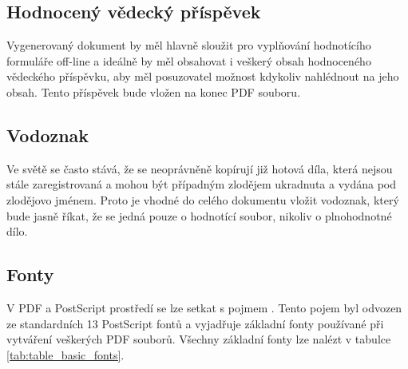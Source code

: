\subsection{Hodnocený vědecký příspěvek}
Vygenerovaný dokument by měl hlavně sloužit pro vyplňování hodnotícího formuláře off-line a ideálně by měl obsahovat i veškerý obsah hodnoceného vědeckého příspěvku, aby měl posuzovatel možnost kdykoliv nahlédnout na jeho obsah. Tento příspěvek bude vložen na konec PDF souboru.

\subsection{Vodoznak}
Ve světě se často stává, že se neoprávněně kopírují již hotová díla, která nejsou stále zaregistrovaná a mohou být případným zlodějem ukradnuta a vydána pod zlodějovo jménem. Proto je vhodné do celého dokumentu vložit vodoznak, který bude jasně říkat, že se jedná pouze o hodnotící soubor, nikoliv o plnohodnotné dílo.

\subsection{Fonty}
\label{subsec:fonty}
V PDF a PostScript prostředí se lze setkat s pojmem . Tento pojem byl odvozen ze standardních 13 PostScript fontů a vyjadřuje základní fonty používané při vytváření veškerých PDF souborů. Všechny základní fonty lze nalézt v tabulce \ref{tab:table_basic_fonts}.

